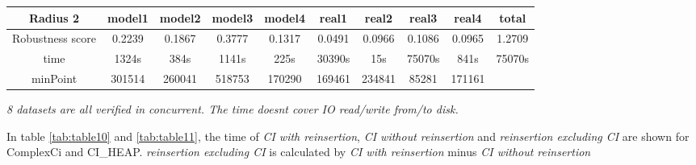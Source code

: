 \documentclass{article}
\begin{document}
\begin{table}[!htbp]
\begin{adjustwidth}{-1cm}{}
\begin{threeparttable}
\begin{tabular}{|c|c|c|c|c|c|c|c|c|c|}
					\textbf{Radius 2} & \textbf{model1} & \textbf{model2} & \textbf{model3} & \textbf{model4} & \textbf{real1} & \textbf{real2} & \textbf{real3} & \textbf{real4} & \textbf{total} \\ \hline
					Robustness score                 & 0.2239          & 0.1867          & 0.3777          & 0.1317          & 0.0491         & 0.0966         & 0.1086         & 0.0965         & 1.2709         \\ \hline
					time                             & 1324s           & 384s            & 1141s           & 225s            & 30390s         & 15s            & 75070s         & 841s           & 75070s         \\ \hline
					minPoint                         & 301514          & 260041          & 518753          & 170290          & 169461         & 234841         & 85281          & 171161         &                \\ \hline				
				\end{tabular}
				\begin{tablenotes}
					\small
					\item\textit{ 8 datasets are all verified in concurrent. The time doesn\textquotesingle t cover IO read/write from/to disk.}
				\end{tablenotes}			
			\end{threeparttable}
		\end{adjustwidth}	
	\end{table}	



	In table \ref{tab:table10} and \ref{tab:table11}, the time of \textit{CI with reinsertion}, \textit{CI without reinsertion} and \textit{reinsertion excluding CI} are shown for ComplexCi and CI\_HEAP. \textit{reinsertion excluding CI} is calculated by \textit{CI with reinsertion} minus \textit{CI without reinsertion}
\end{document}
